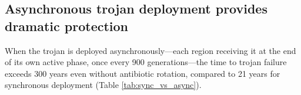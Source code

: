 \documentclass[12pt,a4paper]{article}
\begin{document}
\begin{table}[h]
\centering
\caption{Protection factor for synchronous trojan, two-factor scan.}
\label{tab:twofactor}
\end{table}

\subsection{Asynchronous trojan deployment provides dramatic protection}

When the trojan is deployed asynchronously---each region receiving it at the end of its own active phase, once every 900 generations---the time to trojan failure exceeds 300 years even without antibiotic rotation, compared to 21 years for synchronous deployment (Table \ref{tab:sync_vs_async}).

\begin{table}[h]
\centering
\caption{Synchronous vs.\ asynchronous trojan, no antibiotic rotation.}
\label{tab:sync_vs_async}
\end{table}
\end{document}
